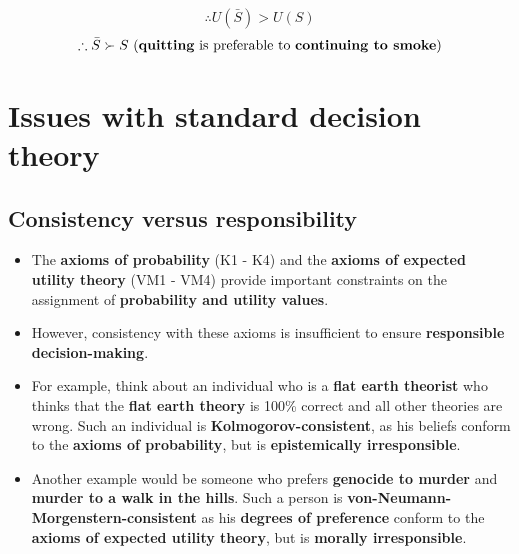 \documentclass[11pt]{article}
\begin{document}
\[\therefore U(\bar{S}) > U(S)\]
\[\therefore \bar{S} \succ S \ \text{(\textbf{quitting} is preferable to \textbf{continuing to smoke})}\]

 \newpage
\section{Issues with standard decision theory}
\label{sec:orgcfa6870}

\subsection{Consistency versus responsibility}
\label{sec:orgfbd174c}
\begin{itemize}
\item The \textbf{axioms of probability} (K1 - K4) and the \textbf{axioms of expected utility theory} (VM1 - VM4) provide important constraints on the assignment of \textbf{probability and utility values}.
\item However, consistency with these axioms is insufficient to ensure \textbf{responsible decision-making}.
\item For example, think about an individual who is a \textbf{flat earth theorist} who thinks that the \textbf{flat earth theory} is 100\% correct and all other theories are wrong. Such an individual is \textbf{Kolmogorov-consistent}, as his beliefs conform to the \textbf{axioms of probability}, but is \textbf{epistemically irresponsible}.
\item Another example would be someone who prefers \textbf{genocide to murder} and \textbf{murder to a walk in the hills}. Such a person is \textbf{von-Neumann-Morgenstern-consistent} as his \textbf{degrees of preference} conform to the \textbf{axioms of expected utility theory}, but is \textbf{morally irresponsible}.
\end{itemize}
\end{document}
